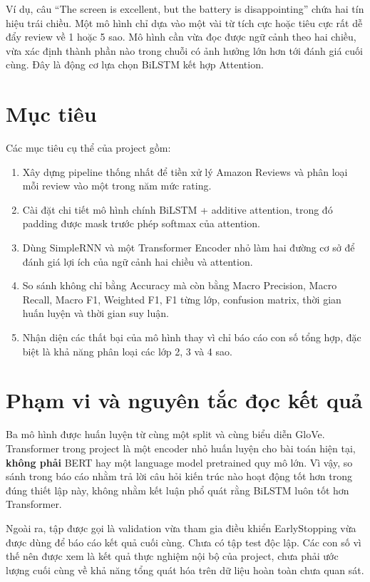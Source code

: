 \documentclass[12pt]{report}
\begin{document}
Ví dụ, câu ``The screen is excellent, but the battery is disappointing'' chứa
hai tín hiệu trái chiều. Một mô hình chỉ dựa vào một vài từ tích cực hoặc tiêu
cực rất dễ đẩy review về 1 hoặc 5 sao. Mô hình cần vừa đọc được ngữ cảnh theo
hai chiều, vừa xác định thành phần nào trong chuỗi có ảnh hưởng lớn hơn tới
đánh giá cuối cùng. Đây là động cơ lựa chọn BiLSTM kết hợp Attention.

\section{Mục tiêu}

Các mục tiêu cụ thể của project gồm:

\begin{enumerate}[label=\arabic*.]
    \item Xây dựng pipeline thống nhất để tiền xử lý Amazon Reviews và phân loại
    mỗi review vào một trong năm mức rating.
    \item Cài đặt chi tiết mô hình chính BiLSTM + additive attention, trong đó
    padding được mask trước phép softmax của attention.
    \item Dùng SimpleRNN và một Transformer Encoder nhỏ làm hai đường cơ sở để
    đánh giá lợi ích của ngữ cảnh hai chiều và attention.
    \item So sánh không chỉ bằng Accuracy mà còn bằng Macro Precision, Macro
    Recall, Macro F1, Weighted F1, F1 từng lớp, confusion matrix,
    thời gian huấn luyện và thời gian suy luận.
    \item Nhận diện các thất bại của mô hình thay vì chỉ báo cáo con số tổng hợp,
    đặc biệt là khả năng phân loại các lớp 2, 3 và 4 sao.
\end{enumerate}

\section{Phạm vi và nguyên tắc đọc kết quả}

Ba mô hình được huấn luyện từ cùng một split và cùng biểu diễn GloVe. Transformer
trong project là một encoder nhỏ huấn luyện cho bài toán hiện tại, \textbf{không
phải} BERT hay một language model pretrained quy mô lớn. Vì vậy, so sánh trong
báo cáo nhằm trả lời câu hỏi kiến trúc nào hoạt động tốt hơn trong đúng thiết
lập này, không nhằm kết luận phổ quát rằng BiLSTM luôn tốt hơn Transformer.

Ngoài ra, tập được gọi là validation vừa tham gia điều khiển EarlyStopping vừa
được dùng để báo cáo kết quả cuối cùng. Chưa có tập test độc lập. Các con số vì
thế nên được xem là kết quả thực nghiệm nội bộ của project, chưa phải ước lượng
cuối cùng về khả năng tổng quát hóa trên dữ liệu hoàn toàn chưa quan sát.
\end{document}
